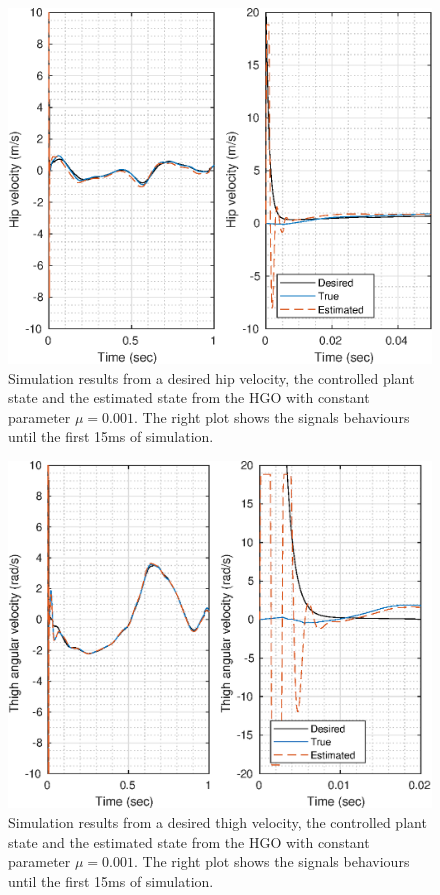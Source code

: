 \documentclass[letterpaper, 10 pt, journal, twocolumn]{IEEEtran}  %
\theoremstyle{plain}
\theoremstyle{definition}
\theoremstyle{remark}
\begin{document}
\begin{figure}[h!]
	\begin{center}
	\includegraphics[width = \columnwidth]{Figs/dq_hip_mu_1e-03.eps}
	\caption{ Simulation results from a desired hip velocity, the controlled plant state and the estimated state from the HGO with constant parameter $\mu=0.001$. The right plot shows the signals behaviours until the first 15ms of simulation.}
	\label{fig:dhip}
	\end{center}
\end{figure}
%
%
\begin{figure}[h!]
	\begin{center}
	\includegraphics[width = \columnwidth]{Figs/dq_thigh_mu_1e-03.eps}
	\caption{Simulation results from a desired thigh velocity, the controlled plant state and the estimated state from the HGO with constant parameter $\mu=0.001$. The right plot shows the signals behaviours until the first 15ms of simulation.}
	\label{fig:dthigh}
	\end{center}
\end{figure}
\end{document}
